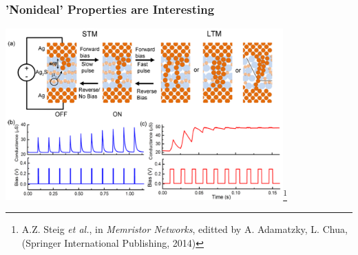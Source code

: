 \documentclass[mathserif]{beamer}
\begin{document}
\begin{frame}
\begin{columns}
\begin{center}
\end{center}
\centering
{}
\end{columns}
\begin{center}

\end{center}

\end{frame}

\begin{frame}
\frametitle{'Nonideal' Properties are Interesting}

\begin{center}
\includegraphics[width=0.8\textwidth]{STM_LTP.png}\footnote{A.Z. Steig \emph{et al.}, in \emph{Memristor Networks}, editted by A. Adamatzky, L. Chua, (Springer International Publishing, 2014)}
\end{center}
\end{frame}
\end{document}
